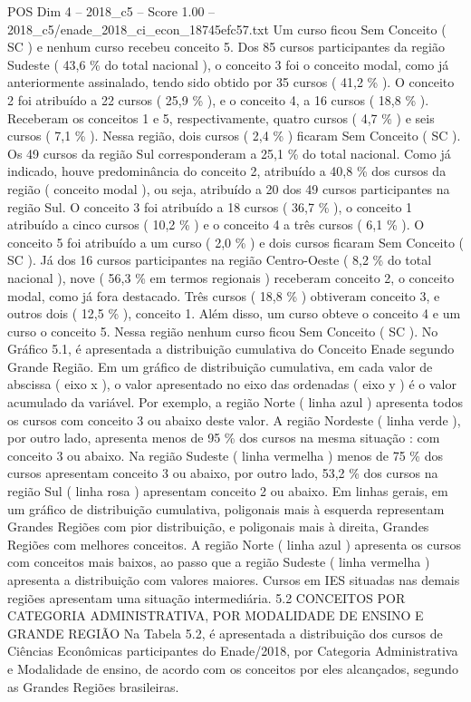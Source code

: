 \begin{textsample}{POS Dim 4 – 2018\_c5 – Score 1.00 – 2018\_c5/enade\_2018\_ci\_econ\_18745efc57.txt}
Um curso ficou Sem Conceito ( SC ) e nenhum curso recebeu conceito 5.
Dos 85 cursos participantes da região Sudeste ( 43,6 \% do total nacional ), o conceito 3 foi o conceito modal, como já anteriormente assinalado, tendo sido obtido por 35 cursos ( 41,2 \% ).
O conceito 2 foi atribuído a 22 cursos ( 25,9 \% ), e o conceito 4, a 16 cursos ( 18,8 \% ).
Receberam os conceitos 1 e 5, respectivamente, quatro cursos ( 4,7 \% ) e seis cursos ( 7,1 \% ).
Nessa região, dois cursos ( 2,4 \% ) ficaram Sem Conceito ( SC ).
Os 49 cursos da região Sul corresponderam a 25,1 \% do total nacional.
Como já indicado, houve predominância do conceito 2, atribuído a 40,8 \% dos cursos da região ( conceito modal ), ou seja, atribuído a 20 dos 49 cursos participantes na região Sul.
O conceito 3 foi atribuído a 18 cursos ( 36,7 \% ), o conceito 1 atribuído a cinco cursos ( 10,2 \% ) e o conceito 4 a três cursos ( 6,1 \% ).
O conceito 5 foi atribuído a um curso ( 2,0 \% ) e dois cursos ficaram Sem Conceito ( SC ).
Já dos 16 cursos participantes na região Centro-Oeste ( 8,2 \% do total nacional ), nove ( 56,3 \% em termos regionais ) receberam conceito 2, o conceito modal, como já fora destacado.
Três cursos ( 18,8 \% ) obtiveram conceito 3, e outros dois ( 12,5 \% ), conceito 1.
Além disso, um curso obteve o conceito 4 e um curso o conceito 5.
Nessa região nenhum curso ficou Sem Conceito ( SC ).
No Gráfico 5.1, é apresentada a distribuição cumulativa do Conceito Enade segundo Grande Região.
Em um gráfico de distribuição cumulativa, em cada valor de abscissa ( eixo x ), o valor apresentado no eixo das ordenadas ( eixo y ) é o valor acumulado da variável.
Por exemplo, a região Norte ( linha azul ) apresenta todos os cursos com conceito 3 ou abaixo deste valor.
A região Nordeste ( linha verde ), por outro lado, apresenta menos de 95 \% dos cursos na mesma situação : com conceito 3 ou abaixo.
Na região Sudeste ( linha vermelha ) menos de 75 \% dos cursos apresentam conceito 3 ou abaixo, por outro lado, 53,2 \% dos cursos na região Sul ( linha rosa ) apresentam conceito 2 ou abaixo.
Em linhas gerais, em um gráfico de distribuição cumulativa, poligonais mais à esquerda representam Grandes Regiões com pior distribuição, e poligonais mais à direita, Grandes Regiões com melhores conceitos.
A região Norte ( linha azul ) apresenta os cursos com conceitos mais baixos, ao passo que a região Sudeste ( linha vermelha ) apresenta a distribuição com valores maiores.
Cursos em IES situadas nas demais regiões apresentam uma situação intermediária. 5.2 CONCEITOS POR CATEGORIA ADMINISTRATIVA, POR MODALIDADE DE ENSINO E GRANDE REGIÃO Na Tabela 5.2, é apresentada a distribuição dos cursos de Ciências Econômicas participantes do Enade/2018, por Categoria Administrativa e Modalidade de ensino, de acordo com os conceitos por eles alcançados, segundo as Grandes Regiões brasileiras.

\end{textsample}
